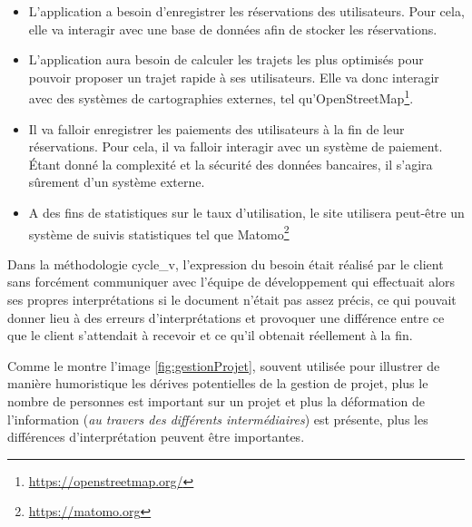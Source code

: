 \begin{itemize}
	\setlength\itemsep{0em}
	\item L'application a besoin d'enregistrer les réservations des utilisateurs. Pour cela, elle va interagir avec une base de données afin de stocker les réservations.
	\item L'application aura besoin de calculer les trajets les plus optimisés pour pouvoir proposer un trajet rapide à ses utilisateurs. Elle va donc interagir avec des systèmes de cartographies externes, tel qu'OpenStreetMap\footnote{\url{https://openstreetmap.org/}}.
	\item Il va falloir enregistrer les paiements des utilisateurs à la fin de leur réservations. Pour cela, il va falloir interagir avec un système de paiement. Étant donné la complexité et la sécurité des données bancaires, il s'agira sûrement d'un système externe.
	\item A des fins de statistiques sur le taux d'utilisation, le site utilisera peut-être un système de suivis statistiques tel que Matomo\footnote{\url{https://matomo.org}} 
\end{itemize}

Dans la méthodologie \gls{cycle_v}, l'expression du besoin était réalisé par le client sans forcément communiquer avec l'équipe de développement qui effectuait alors ses propres interprétations si le document n'était pas assez précis, ce qui pouvait donner lieu à des erreurs d'interprétations et provoquer une différence entre ce que le client s'attendait à recevoir et ce qu'il obtenait réellement à la fin. 


Comme le montre l'image \ref{fig:gestionProjet}, souvent utilisée pour illustrer de manière humoristique les dérives potentielles de la gestion de projet, plus le nombre de personnes est important sur un projet et plus la déformation de l'information (\emph{au travers des différents intermédiaires}) est présente, plus les différences d'interprétation peuvent être importantes. 

